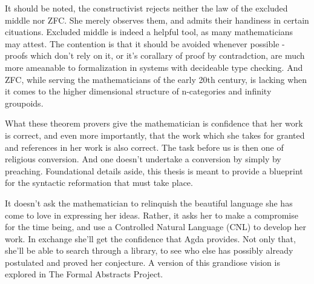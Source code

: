 It should be noted, the constructivist rejects neither the law of the excluded
middle nor ZFC. She merely observes them, and admits their handiness in certain
cituations. Excluded middle is indeed a helpful tool, as many mathematicians
may attest. The contention is that it should be avoided whenever possible -
proofs which don't rely on it, or it's corallary of proof by contradction, are
much more ameanable to formalization in systems with decideable type checking.
And ZFC, while serving the mathematicians of the early 20th century, is 
lacking when it comes to the higher dimensional structure of n-categories and
infinity groupoids.

What these theorem provers give the mathematician is confidence that her work
is correct, and even more importantly, that the work which she takes for
granted and references in her work is also correct. The task before us is then
one of religious conversion. And one doesn't undertake a conversion by simply
by preaching. Foundational details aside, this thesis is meant to provide a
blueprint for the syntactic reformation that must take place.  

It doesn't ask the mathematician to relinquish the beautiful language she has
come to love in expressing her ideas.  Rather, it asks her to make a compromise
for the time being, and use a Controlled Natural Language (CNL) to develop her
work. In exchange she'll get the confidence that Agda provides. Not only that,
she'll be able to search through a library, to see who else has possibly
already postulated and proved her conjecture. A version of this grandiose vision is 
explored in The Formal Abstracts Project.
